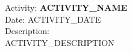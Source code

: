 Activity: \textbf{{{ ACTIVITY_NAME }}} \\
Date: {{ ACTIVITY_DATE }} \\
Description: \\
{{ ACTIVITY_DESCRIPTION }}
\\